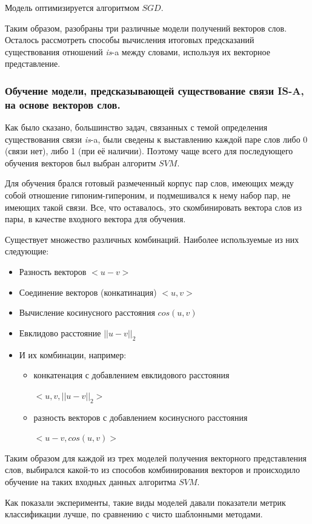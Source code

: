 Модель оптимизируется алгоритмом $SGD$.

Таким образом, разобраны три различные модели получений векторов слов.
Осталось рассмотреть способы вычисления итоговых предсказаний существования
отношений \textit{is}-a между словами, используя их векторное представление.



\subsubsection{Обучение модели, предсказывающей существование связи IS-A, на основе векторов слов.}

Как было сказано, большинство задач, связанных с темой определения
существования связи \textit{is}-a, были сведены к выставлению каждой паре слов либо 0
(связи нет), либо 1 (при её наличии). Поэтому чаще всего для последующего
обучения векторов был выбран алгоритм $SVM$.

Для обучения брался готовый размеченный корпус пар слов, имеющих между
собой отношение гипоним-гипероним, и подмешивался к нему набор пар, не
имеющих такой связи. Все, что оставалось, это скомбинировать вектора слов из
пары, в качестве входного вектора для обучения.

Существует множество различных комбинаций. Наиболее используемые из них
следующие:

\begin{itemize}
\item Разность векторов $<u - v>$
\item Соединение векторов (конкатинация) $<u, v>$
\item Вычисление косинусного расстояния $cos(u, v)$
\item Евклидово расстояние $|| u - v ||_2$
\item И их комбинации, например:
\begin{itemize}
\item конкатенация с добавлением евклидового расстояния

$<u, v, || u - v ||_2>$
\item разность векторов с добавлением косинусного расстояния

$<u - v, cos(u, v)>$
\end{itemize}
\end{itemize}

Таким образом для каждой из трех моделей получения векторного представления
слов, выбирался какой-то из способов комбинирования векторов и происходило
обучение на таких входных данных алгоритма $SVM$.

Как показали эксперименты, такие виды моделей давали показатели метрик
классификации лучше, по сравнению с чисто шаблонными методами.